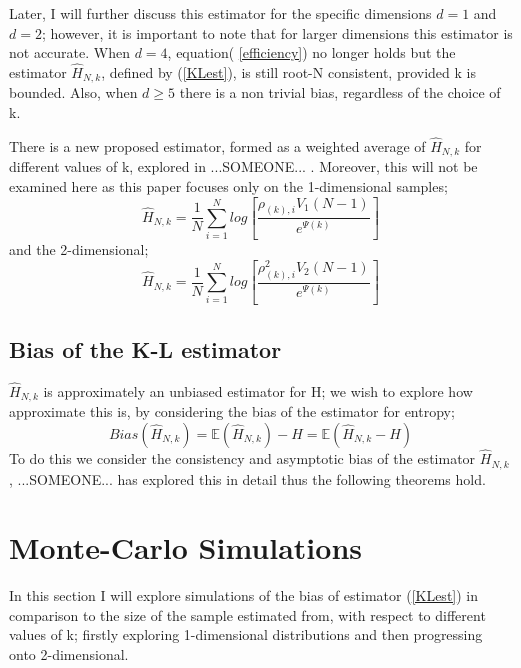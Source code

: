 \documentclass{article}
\begin{document}
Later, I will further discuss this estimator for the specific dimensions $d=1$ and $d=2$; however, it is important to note that for larger dimensions this estimator is not accurate. When $d=4$, equation( \ref{efficiency}) no longer holds but the estimator $\hat{H}_{N, k}$, defined by (\ref{KLest}), is still root-N consistent, provided k is bounded. Also, when $d \geq 5$ there is a non trivial bias, regardless of the choice of k. 

There is a new proposed estimator, formed as a weighted average of $\hat{H}_{N, k}$ for different values of k, explored in ...SOMEONE... . Moreover, this will not be examined here as this paper focuses only on the 1-dimensional samples;
\begin{equation} \label{KLestd=1}
\hat{H}_{N, k} = \frac{1}{N} \sum_{i=1}^{N} log \left[ \frac{\rho_{(k),i} V_{1} (N-1)}{e^{\Psi(k)}} \right]
\end{equation}
and the 2-dimensional;
\begin{equation} \label{KLestd=2}
\hat{H}_{N, k} = \frac{1}{N} \sum_{i=1}^{N} log \left[ \frac{\rho_{(k),i}^{2} V_{2} (N-1)}{e^{\Psi(k)}} \right]
\end{equation}



\subsection{Bias of the K-L estimator}
$\hat{H}_{N, k}$ is approximately an unbiased estimator for H; we wish to explore how approximate this is, by considering the bias of the estimator for entropy;
\begin{equation} \label{Bias}
Bias(\hat{H}_{N, k} ) = \mathbb{E}(\hat{H}_{N, k}) - H = \mathbb{E}(\hat{H}_{N, k} - H)
\end{equation}
To do this we consider the consistency and asymptotic bias of the estimator $\hat{H}_{N, k}$, ...SOMEONE... has explored this in detail thus the following theorems hold.



\section{Monte-Carlo Simulations}

In this section I will explore simulations of the bias of estimator (\ref{KLest}) in comparison to the size of the sample estimated from, with respect to different values of k; firstly exploring 1-dimensional distributions and then progressing onto 2-dimensional.
\end{document}
